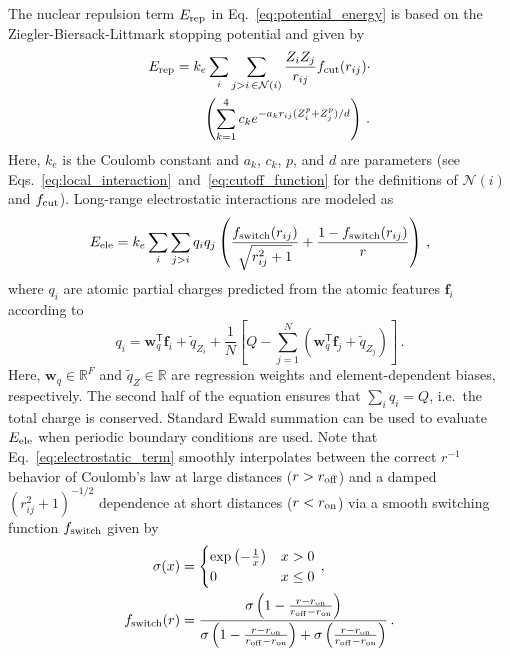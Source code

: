 \documentclass[%
superscriptaddress,
reprint,
nofootinbib,
amsmath,amssymb,amsfonts,
floatfix,
altaffilletter,
showkeys,
]{revtex4-2}
\begin{document}
The nuclear repulsion term $E_{\rm rep}$ in Eq.~\ref{eq:potential_energy} is based on the Ziegler-Biersack-Littmark stopping potential\cite{ziegler1985stopping} and given by
\begin{equation}
\begin{split}
E_{\rm rep} &=  k_e  \sum_{i}\sum_{j>i\,\in\mathcal{N}(i)}  \frac{Z_iZ_j}{r_{ij}} f_{\rm cut}(r_{ij}) \cdot \\
&\qquad \left(\sum_{k=1}^{4} c_ke^{-a_k r_{ij} (Z_i^p+Z_j^p)/d}\right)\,.
\end{split}
\label{eq:repuslion_term}
\end{equation}
Here, $k_e$ is the Coulomb constant and $a_k$, $c_k$, $p$, and $d$ are parameters (see Eqs.~\ref{eq:local_interaction}~and~\ref{eq:cutoff_function} for the definitions of $\mathcal{N}(i)$ and $f_{\rm cut}$). Long-range electrostatic interactions are modeled as
\begin{equation}
E_{\rm ele} = k_e  \sum_{i}\sum_{j>i} q_iq_j\left(\frac{f_{\rm switch}(r_{ij})}{\sqrt{r_{ij}^2+1}} + \frac{1-f_{\rm switch}(r_{ij})}{r}\right)\,,
\label{eq:electrostatic_term}
\end{equation}
where $q_i$ are atomic partial charges predicted from the atomic features $\mathbf{f}_i$ according to
\begin{equation}
q_i = \mathbf{w}_q^{\mathsf{T}}\mathbf{f}_i + \tilde{q}_{Z_i} + \frac{1}{N}\left[Q-\sum_{j=1}^N\left(\mathbf{w}_q^{\mathsf{T}}\mathbf{f}_j + \tilde{q}_{Z_j}\right)\right]\,.
\label{eq:partial_charges}
\end{equation}
Here, $\mathbf{w}_q \in \mathbb{R}^F$ and $\tilde{q}_{Z}\in \mathbb{R}$ are regression weights and element-dependent biases, respectively. The second half of the equation ensures that $\sum_i q_i = Q$, i.e.\ the total charge is conserved. Standard Ewald summation\cite{ewald1921berechnung} can be used to evaluate $E_{\rm ele}$ when periodic boundary conditions are used.
Note that Eq.~\ref{eq:electrostatic_term} smoothly interpolates between the correct $r^{-1}$ behavior of Coulomb's law at large distances ($r > r_{\rm off}$) and a damped $(r_{ij}^2+1)^{-1/2}$ dependence at short distances ($r < r_{\rm on}$) via a smooth switching function $f_{\rm switch}$ given by
\begin{equation}
\begin{aligned}
\sigma(x) &= \begin{cases}
\exp\left(-\frac{1}{x}\right)& x > 0\\
0 & x \leq 0
\end{cases}\,,\\
f_{\rm switch}(r) &= \frac{\sigma\left(1-\frac{r-r_{\rm on}}{r_{\rm off}-r_{\rm on}}\right)}{\sigma\left(1-\frac{r-r_{\rm on}}{r_{\rm off}-r_{\rm on}}\right) +  \sigma\left(\frac{r-r_{\rm on}}{r_{\rm off}-r_{\rm on}}\right)}\,.
\end{aligned}
\label{eq:switch_function}
\end{equation}
\end{document}

